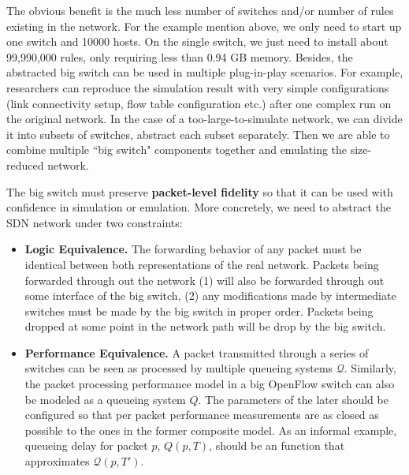 The obvious benefit is the much less number of switches and/or number of rules existing in the network.
For the example mention above, we only need to start up one switch and 10000 hosts.
On the single switch, we just need to install about 99,990,000 rules, only requiring less than 0.94 GB memory.
Besides, the abstracted big switch can be used in multiple plug-in-play scenarios.
For example, researchers can reproduce the simulation result with very
simple configurations (link connectivity setup, flow table configuration etc.)
after one complex run on the original network.
In the case of a too-large-to-simulate network, we can divide it into subsets of switches,
abstract each subset separately.
Then we are able to combine multiple ``big switch" components together
and emulating the size-reduced network.

The big switch must preserve \textbf{packet-level fidelity} so that
it can be used with confidence in simulation or emulation.
More concretely, we need to abstract the SDN network under two constraints:
\begin{itemize}
\item \textbf{Logic Equivalence.} The forwarding behavior of any packet must be identical
        between both representations of the real network. Packets being
        forwarded through out the network (1) will also be forwarded through out
        some interface of the big switch, (2) any modifications made by
        intermediate switches must be made by the big switch in proper order.
        Packets being dropped at some point in the network path will be drop by the
        big switch.
\item \textbf{Performance Equivalence.} A packet transmitted through a series of
        switches can be seen as processed by multiple queueing systems $\mathcal{Q}$.
        Similarly, the packet processing performance model in a big OpenFlow switch can
        also be modeled as a queueing system $Q$.
        The parameters of the later should be configured so that per packet performance
        measurements are as closed as possible to the ones in the former composite model.
        As an informal example, queueing delay for packet $p$, $Q(p, T)$, should be an
        function that approximates $\mathcal{Q}(p, T')$.
\end{itemize}

